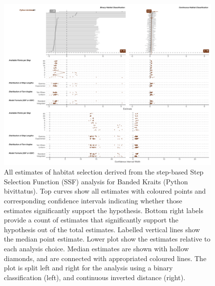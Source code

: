 \documentclass[10pt,a4paper]{article}
\begin{document}
\begin{figure}
\includegraphics[width=1\linewidth]{../../figures/specCurve_Python bivittatus_ssf} \caption{All estimates of habitat selection derived from the step-based Step Selection Function (SSF) analysis for Banded Kraits (Python bivittatus). Top curves show all estimates with coloured points and corresponding confidence intervals indicating whether those estimates significantly support the hypothesis. Bottom right labels provide a count of estimates that significantly support the hypothesis out of the total estimates. Labelled vertical lines show the median point estimate. Lower plot show the estimates relative to each analysis choice. Median estimates are shown with hollow diamonds, and are connected with appropriated coloured lines. The plot is split left and right for the analysis using a binary classification (left), and continuous inverted distance (right).}\label{fig:specCurveSsfPYBI}
\end{figure}
\end{document}
